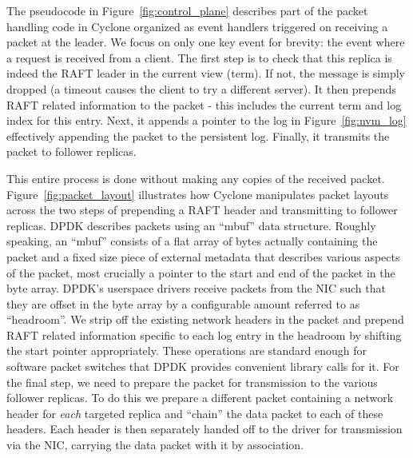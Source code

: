 \documentclass[pageno]{jpaper}
\begin{document}
The pseudocode in Figure~\ref{fig:control_plane} describes part of the packet
handling code in Cyclone organized as event handlers triggered on receiving a
packet at the leader. We focus on only one key event for brevity: the event
where a request is received from a client. The first step is to check that this
replica is indeed the RAFT leader in the current view (term). If not, the
message is simply dropped (a timeout causes the client to try a different
server). It then prepends RAFT related information to the packet - this includes
the current term and log index for this entry. Next, it appends a pointer to the
log in Figure~\ref{fig:nvm_log} effectively appending the packet to the
persistent log. Finally, it transmits the packet to follower replicas.

This entire process is done without making any copies of the received packet.
Figure~\ref{fig:packet_layout} illustrates how
Cyclone manipulates packet layouts across the two steps of prepending a RAFT
header and transmitting to follower replicas. DPDK describes packets using an
``mbuf'' data structure. Roughly speaking, an ``mbuf'' consists of a flat array
of bytes actually containing the packet and a fixed size piece of external
metadata that describes various aspects of the packet, most crucially a pointer
to the start and end of the packet in the byte array. DPDK's userspace drivers
receive packets from the NIC such that they are offset in the byte array by a
configurable amount referred to as ``headroom''. We strip off the existing
network headers in the packet and prepend RAFT related information specific to
each log entry in the headroom by shifting the start pointer appropriately.
These operations are standard enough for software packet switches that DPDK
provides convenient library calls for it. For the final step, we need to prepare
the packet for transmission to the various follower replicas. To do this we
prepare a different packet containing a network header for \emph{each}
targeted replica and ``chain'' the data packet to each of these headers. Each
header is then separately handed off to the driver for transmission via the NIC,
carrying the data packet with it by association.
\end{document}
